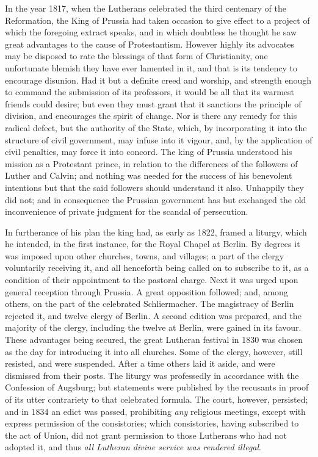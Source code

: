 In the year 1817, when the Lutherans celebrated the
third centenary of the Reformation, the King of Prussia had taken
occasion to give effect to a project of which the foregoing extract
speaks, and in which doubtless he thought he saw great advantages to the
cause of Protestantism. However highly its advocates may be disposed to
rate the blessings of that form of Christianity, one unfortunate blemish
they have ever lamented in it, and that is its tendency to encourage
disunion. Had it but a definite creed and worship, and strength enough
to command the submission of its professors, it would be all that its
warmest friends could desire; but even they must grant that it sanctions
the principle of division, and encourages the spirit of change. Nor is
there any remedy for this radical defect, but the authority of the
State, which, by incorporating it into the structure of civil
government, may infuse into it vigour, and, by the application of civil
penalties, may force it into concord. The king of Prussia understood his
mission as a Protestant prince, in relation to the differences of the
followers of Luther and Calvin; and nothing was needed for the success
of his benevolent intentions but that the said followers should
understand it also. Unhappily they did not; and in consequence the
Prussian government has but exchanged the old inconvenience of private
judgment for the scandal of persecution.

In furtherance of his plan the king had, as early
as 1822, framed a liturgy, which he intended, in the first instance, for
the Royal Chapel at Berlin. By degrees it was imposed upon other
churches, towns, and villages; a part of the clergy voluntarily
receiving it, and all henceforth being called on to subscribe to it, as
a condition of their appointment to the pastoral charge. Next it was
urged upon general reception through Prussia. A great opposition
followed; and, among others, on the part of the celebrated Schliermacher.
The magistracy of Berlin rejected it, and twelve clergy of Berlin. A
second edition was prepared, and the majority of the clergy, including
the twelve at Berlin, were gained in its favour. These advantages being
secured, the great Lutheran festival in 1830 was chosen as the day for
introducing it into all churches. Some of the clergy, however, still
resisted, and were suspended. After a time others laid it aside, and
were dismissed from their posts. The liturgy was professedly in
accordance with the Confession of Augsburg; but statements were
published by the recusants in proof of its utter contrariety to that
celebrated formula. The court, however, persisted; and in 1834 an edict
was passed, prohibiting \emph{any} religious meetings, except with
express permission of the consistories; which consistories, having
subscribed to the act of Union, did not grant permission to those
Lutherans who had not adopted it, and thus \emph{all Lutheran divine
service was rendered illegal}.


